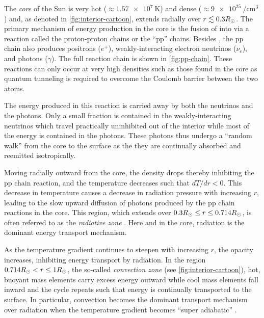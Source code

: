 The \textit{core} of the Sun is very hot ($\approx\SI{1.57e7}{\kelvin}$) and dense ($\approx\SI{9e25}{\per\cubic\cm}$) \citep{carroll_introduction_2007,bahcall_solar_2001} and, as denoted in \autoref{fig:interior-cartoon}, extends radially over $r\lesssim 0.3R_\odot$. The primary mechanism of energy production in the core is the fusion of  into  via a reaction called the proton-proton chains or the ``pp'' chains. Besides , the pp chain also produces positrons ($e^+$), weakly-interacting electron neutrinos ($\nu_e$), and photons ($\gamma$). The full reaction chain is shown in \autoref{fig:pp-chain}. These reactions can only occur at very high densities such as those found in the core as quantum tunneling is required to overcome the Coulomb barrier between the two  atoms.

The energy produced in this reaction is carried away by both the neutrinos and the photons. Only a small fraction is contained in the weakly-interacting neutrinos which travel practically uninhibited out of the interior while most of the energy is contained in the photons. These photons thus undergo a ``random walk'' from the core to the surface as the they are continually absorbed and reemitted isotropically. 

Moving radially outward from the core, the density drops thereby inhibiting the pp chain reaction, and the temperature decreases such that $dT/dr < 0$. This decrease in temperature causes a decrease in radiation pressure with increasing $r$, leading to the slow upward diffusion of photons produced by the pp chain reactions in the core. This region, which extends over $0.3R_\odot\le r\le 0.714R_\odot$, is often referred to as the \textit{radiative zone} \citep{carroll_introduction_2007}. Here and in the core, radiation is the dominant energy transport mechanism.

As the temperature gradient continues to steepen with increasing $r$, the opacity increases, inhibiting energy transport by radiation. In the region $0.714R_\odot<r\le1R_\odot$, the so-called \textit{convection zone} (see \autoref{fig:interior-cartoon}), hot, buoyant mass elements carry excess energy outward while cool mass elements fall inward and the cycle repeats such that energy is continually transported to the surface. In particular, convection becomes the dominant transport mechanism over radiation when the temperature gradient becomes ``super adiabatic'' \citep[see Section 10.4 of][]{carroll_introduction_2007}.

